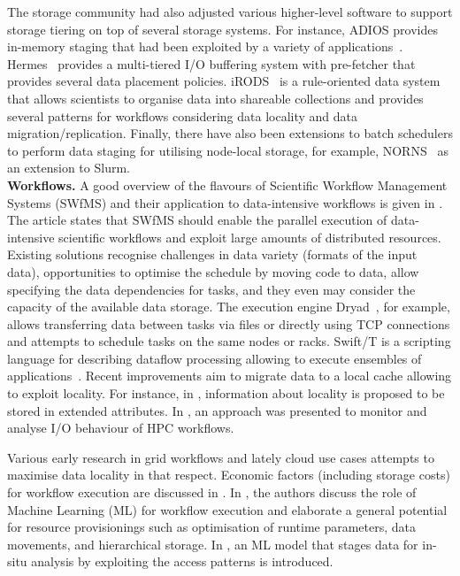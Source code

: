 \documentclass{superfri}
\begin{document}
The storage community had also adjusted various higher-level software to support storage tiering on top of several storage systems. For instance, ADIOS provides in-memory staging that had been exploited by a variety of applications~\cite{slawinska2013maya}.
Hermes~\cite{kougkas2020acceleration} provides a multi-tiered I/O buffering system with pre-fetcher that provides several data placement policies.
iRODS~\cite{rajasekar2010irods} is a rule-oriented data system that allows scientists to organise data into shareable collections and provides several patterns for workflows considering data locality and data migration/replication.
Finally, there have also been extensions to batch schedulers to perform data staging for utilising node-local storage, for example, NORNS~\cite{miranda2019norns} as an extension to Slurm.\\

\textbf{Workflows. }
A good overview of the flavours of Scientific Workflow Management Systems (SWfMS) and their application to data-intensive workflows is given in \cite{liu2015survey}.
The article states that SWfMS should enable the parallel execution of data-intensive scientific workflows and exploit large amounts of distributed resources.
Existing solutions recognise challenges in data variety (formats of the input data), opportunities to optimise the schedule by moving code to data, allow specifying the data dependencies for tasks, and they even may consider the capacity of the available data storage.
The execution engine Dryad~\cite{isard2007dryad}, for example, allows transferring data between tasks via files or directly using TCP connections and attempts to schedule tasks on the same nodes or racks.
Swift/T is a scripting language for describing dataflow processing allowing to execute ensembles of applications~\cite{ozik2016desktop}.
Recent improvements aim to migrate data to a local cache allowing to exploit locality.
For instance, in \cite{dai2018cross}, information about locality is proposed to be stored in extended attributes.
In \cite{TUIBIHWLSC19}, an approach was presented to monitor and analyse I/O behaviour of HPC workflows.

Various early research in grid workflows and lately cloud use cases attempts to maximise data locality in that respect.
Economic factors (including storage costs) for workflow execution are discussed in \cite{alkhanak2016cost}.
In \cite{deelman2019role}, the authors discuss the role of Machine Learning (ML) for workflow execution and elaborate a general potential for resource provisionings such as optimisation of runtime parameters, data movements, and hierarchical storage.
In \cite{subedi2019leveraging}, an ML model that stages data for in-situ analysis by exploiting the access patterns is introduced.
\end{document}

